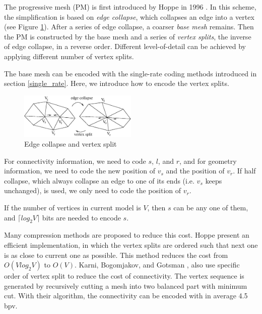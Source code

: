     The progressive mesh (PM) \label{progressive_mesh}is first
    introduced by Hoppe in 1996 \cite{hoppe96progressive}. In this
    scheme, the simplification is based on \emph{edge collapse}, which
    collapses an edge into a vertex (see Figure \ref{split2}).
    After a series of edge collapse, a coarser \emph{base mesh} remains. 
    Then the PM is constructed by the base mesh and a series of \emph{vertex
    splits}, the inverse of edge collapse, in a reverse order.
    Different level-of-detail can be achieved by applying different number
    of vertex splits.

    The base mesh can be encoded with the single-rate coding methods
    introduced in section \ref{single_rate}. Here, we introduce
    how to encode the vertex splits. 
\begin{figure}
\centering
\includegraphics[width=0.5\textwidth]{split2.eps}
\caption{Edge collapse and vertex split}\label{split2}
\end{figure}
    For connectivity
    information, we need to code $s$, $l$, and $r$, and for geometry
    information, we need to code the new position of $v_{s}$ and the
    position of $v_{r}$. If half collapse, which always collapse an
    edge to one of its ends (i.e. $v_{s}$ keeps unchanged), is used, 
    we only need to code the position of $v_r$. 
    
    If the number of vertices in current model is
    $V$, then $s$ can be any one of them, 
    and ${\lceil}log_{2}V{\rceil}$ bits are needed to encode $s$. 
    
    Many compression methods are proposed to reduce this cost.
    Hoppe \cite{efficient:hoppe} present an efficient implementation,
    in which the vertex splits are ordered such that next one
    is as close to current one as possible. This method reduces the cost
    from $O(Vlog_{2}V)$ to $O(V)$.
    Karni, Bogomjakov, and Gotsman \cite{602153}, 
    also use specific order of vertex split to reduce the cost of connectivity. 
    The vertex sequence is generated by recursively cutting a mesh into two
    balanced part with minimum cut. With their algorithm, the connectivity can
    be encoded with in average 4.5 bpv. 

